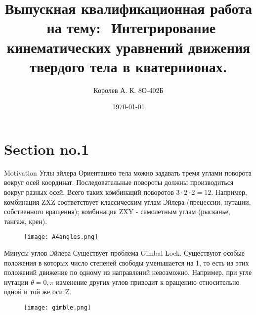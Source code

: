 \documentclass{beamer}
\begin{document}
\title{Выпускная квалификационная работа  на тему: 
Интегрирование кинематических уравнений движения твердого тела в кватернионах.}   
\author{Королев А. К. 8О-402Б} 
\date{\today} 

\frame{\titlepage} 



\section{Section no.1} 
\begin{frame}{Motivation}
  Углы эйлера
  Ориентацию тела можно задавать тремя углами поворота вокруг осей координат.
  Последовательные повороты должны производиться вокруг разных осей. Всего таких
  комбинаций поворотов \( 3 \cdot 2 \cdot 2 = 12 \). Например, комбинация ZXZ
  соответствует классическим углам Эйлера (прецессии, нутации, собственного
  вращения);
  комбинация ZXY - самолетным углам (рысканье, тангаж, крен).
  \begin{figure}
    \texttt{[image: A4angles.png]}
  \end{figure}
\end{frame}
\begin{frame}{Минусы углов Эйлера}
  Существует проблема Gimbal Lock.
  Существуют особые положения в которых число степеней свободы уменьшается на 1,
  то есть из этих положений движение по одному из направлений невозможно.
  Например, при угле нутации \( \theta = 0, \pi \) изменение других углов
  приводит к вращению относительно одной и той же оси Z. 
  \begin{figure}
    \texttt{[image: gimble.png]}
  \end{figure}
  
\end{frame}
\end{document}
